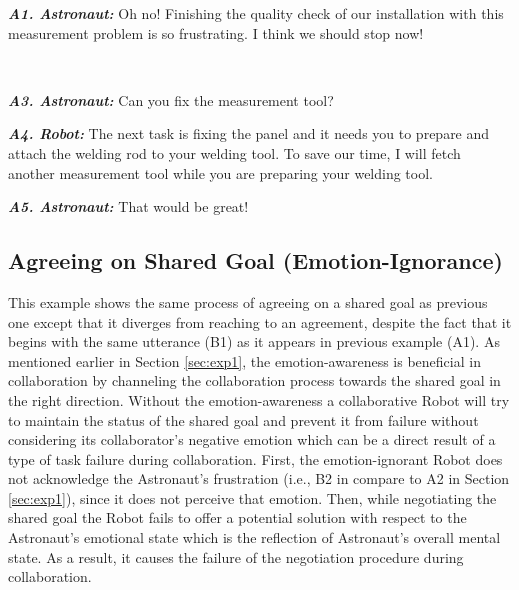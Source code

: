 \begin{spacing}{1.3}
\small{ 
\begin{description}
  \item \textit{\textbf{A1. Astronaut:}} Oh no! Finishing the quality check of
  our installation with this measurement problem is so frustrating. I think we
  should stop now!\\

  \item {}\\
  
  \item \textit{\textbf{A3. Astronaut:}} Can you fix the measurement tool?\\

  \item \textit{\textbf{A4. Robot:}} The next task is fixing the panel and it
  needs you to prepare and attach the welding rod to your welding tool. To save
  our time, I will fetch another measurement tool while you are preparing your
  welding tool.\\

  \item \textit{\textbf{A5. Astronaut:}} That would be great!
  
\end{description}
}
\end{spacing}

\subsection{Agreeing on Shared Goal (Emotion-Ignorance)}
\label{sec:exp2}

This example shows the same process of agreeing on a shared goal as previous
one except that it diverges from reaching to an agreement, despite the fact
that it begins with the same utterance (B1) as it appears in previous example
(A1). As mentioned earlier in Section \ref{sec:exp1}, the emotion-awareness is
beneficial in collaboration by channeling the collaboration process towards the
shared goal in the right direction. Without the emotion-awareness a
collaborative Robot will try to maintain the status of the shared goal and
prevent it from failure without considering its collaborator's negative emotion
which can be a direct result of a type of task failure during collaboration.
First, the emotion-ignorant Robot does not acknowledge the Astronaut's
frustration (i.e., B2 in compare to A2 in Section \ref{sec:exp1}), since it does
not perceive that emotion. Then, while negotiating the shared goal the Robot
fails to offer a potential solution with respect to the Astronaut's emotional
state which is the reflection of Astronaut's overall mental state. As a result,
it causes the failure of the negotiation procedure during collaboration.

